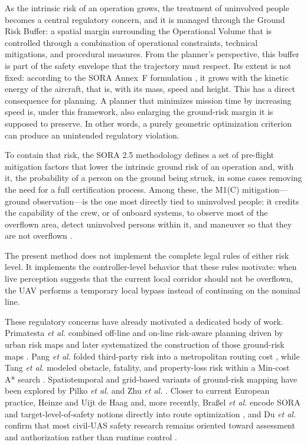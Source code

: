 \documentclass[drones,article,submit,moreauthors]{Definitions/mdpi}
\begin{document}
As the intrinsic risk of an operation grows, the treatment of uninvolved people becomes a central regulatory concern, and it is managed through the Ground Risk Buffer: a spatial margin surrounding the Operational Volume that is controlled through a combination of operational constraints, technical mitigations, and procedural measures. From the planner's perspective, this buffer is part of the safety envelope that the trajectory must respect. Its extent is not fixed: according to the SORA Annex~F formulation \cite{JARUS_SORA_2_5_2024}, it grows with the kinetic energy of the aircraft, that is, with its mass, speed and height. This has a direct consequence for planning. A planner that minimizes mission time by increasing speed \cite{dong2017efficient} is, under this framework, also enlarging the ground-risk margin it is supposed to preserve. In other words, a purely geometric optimization criterion can produce an unintended regulatory violation.

To contain that risk, the SORA 2.5 methodology defines a set of pre-flight mitigation factors that lower the intrinsic ground risk of an operation and, with it, the probability of a person on the ground being struck, in some cases removing the need for a full certification process. Among these, the M1(C) mitigation---ground observation---is the one most directly tied to uninvolved people: it credits the capability of the crew, or of onboard systems, to observe most of the overflown area, detect uninvolved persons within it, and maneuver so that they are not overflown \cite{EASA_AMC_GM_SORA25_2025}.

 The present method does not implement the complete legal rules of either risk level. It implements the controller-level behavior that these rules motivate: when live perception suggests that the current local corridor should not be overflown, the UAV performs a temporary local bypass instead of continuing on the nominal line.

 
These regulatory concerns have already motivated a dedicated body of work. Primatesta \emph{et al.} combined off-line and on-line risk-aware planning driven by urban risk maps \cite{primatesta2019riskaware} and later systematized the construction of those ground-risk maps \cite{primatesta2020groundrisk}. Pang \emph{et al.} folded third-party risk into a metropolitan routing cost \cite{pang2022integrated}, while Tang \emph{et al.} modeled obstacle, fatality, and property-loss risk within a Min-cost A* search \cite{tang2023thirdparty}. Spatiotemporal and grid-based variants of ground-risk mapping have been explored by Pilko \emph{et al.} and Zhu \emph{et al.} \cite{pilko2023spatiotemporal,zhang2023groundrisk}. Closer to current European practice, Heinze and Uijt de Haag and, more recently, Bra{\ss}el \emph{et al.} encode SORA and target-level-of-safety notions directly into route optimization \cite{heinze2023sora,brassel2025riskaware}, and Du \emph{et al.} confirm that most civil-UAS safety research remains oriented toward assessment and authorization rather than runtime control \cite{du2024safetyrisk}.
\end{document}
